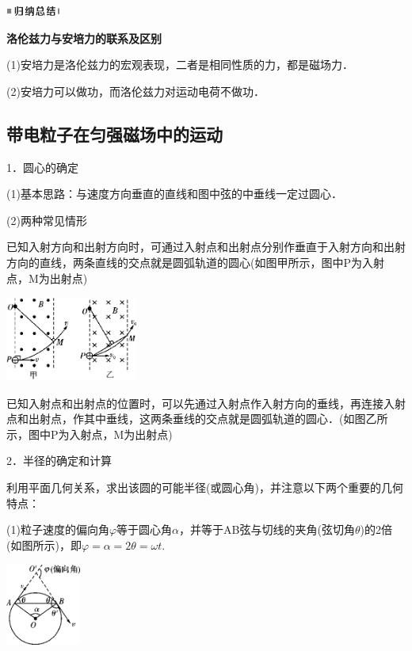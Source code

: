 \documentclass[cn,10.5pt,chinese,mac,chinesefont=founder]{elegantbook}
\begin{document}
\begin{center}\includegraphics[width=0.70764in,height=0.12292in]{media/image13.png}\end{center}
\begin{center}
	\textbf{洛伦兹力与安培力的联系及区别}
\end{center}


(1)安培力是洛伦兹力的宏观表现，二者是相同性质的力，都是磁场力．

(2)安培力可以做功，而洛伦兹力对运动电荷不做功．
\newpage
\subsection{带电粒子在匀强磁场中的运动}

1．圆心的确定

(1)基本思路：与速度方向垂直的直线和图中弦的中垂线一定过圆心．

(2)两种常见情形

已知入射方向和出射方向时，可通过入射点和出射点分别作垂直于入射方向和出射方向的直线，两条直线的交点就是圆弧轨道的圆心(如图甲所示，图中P为入射点，M为出射点)

\begin{center}\includegraphics[width=1.70764in,height=1.10347in]{media/image353.png}\end{center}

已知入射点和出射点的位置时，可以先通过入射点作入射方向的垂线，再连接入射点和出射点，作其中垂线，这两条垂线的交点就是圆弧轨道的圆心．(如图乙所示，图中P为入射点，M为出射点)

2．半径的确定和计算

利用平面几何关系，求出该圆的可能半径(或圆心角)，并注意以下两个重要的几何特点：

(1)粒子速度的偏向角$\varphi$等于圆心角$\alpha$，并等于AB弦与切线的夹角(弦切角$\theta$)的2倍(如图所示)，即$\varphi=\alpha=2\theta=\omega t$.

\begin{center}\includegraphics[width=0.97153in,height=1.05694in]{media/image354.png}\end{center}
\end{document}
